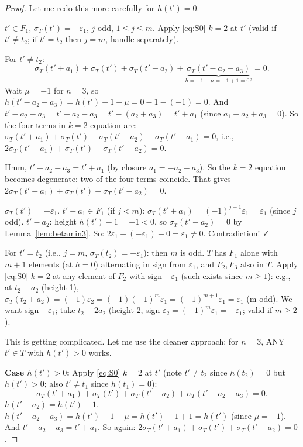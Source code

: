 \begin{proof}
Let me redo this more carefully for $h(t')=0$.

$t' \in F_1$, $\sigma_T(t') = -\varepsilon_1$, $j$ odd, $1 \leq j \leq m$. Apply \eqref{eq:S0} $k=2$ at $t'$ (valid if $t' \neq t_2$; if $t'=t_2$ then $j=m$, handle separately).

For $t' \neq t_2$:
\[
  \sigma_T(t'+a_1) + \sigma_T(t') + \sigma_T(t'-a_2) + \underbrace{\sigma_T(t'-a_2-a_3)}_{h = -1-\mu = -1+1=0?} = 0.
\]
Wait $\mu = -1$ for $n=3$, so $h(t'-a_2-a_3) = h(t') - 1 - \mu = 0 - 1 - (-1) = 0$. And $t'-a_2-a_3 = t' - a_2 - a_3 = t' - (a_2+a_3) = t'+a_1$ (since $a_1+a_2+a_3=0$). So the four terms in $k=2$ equation are: $\sigma_T(t'+a_1) + \sigma_T(t') + \sigma_T(t'-a_2) + \sigma_T(t'+a_1) = 0$, i.e., $2\sigma_T(t'+a_1) + \sigma_T(t') + \sigma_T(t'-a_2) = 0$.

Hmm, $t'-a_2-a_3 = t'+a_1$ (by closure $a_1=-a_2-a_3$). So the $k=2$ equation becomes degenerate: two of the four terms coincide. That gives $2\sigma_T(t'+a_1)+\sigma_T(t')+\sigma_T(t'-a_2)=0$.

$\sigma_T(t') = -\varepsilon_1$. $t'+a_1 \in F_1$ (if $j < m$): $\sigma_T(t'+a_1)=(-1)^{j+1}\varepsilon_1 = \varepsilon_1$ (since $j$ odd). $t'-a_2$: height $h(t')-1 = -1 < 0$, so $\sigma_T(t'-a_2)=0$ by Lemma~\ref{lem:betamin3}. So: $2\varepsilon_1 + (-\varepsilon_1) + 0 = \varepsilon_1 \neq 0$. Contradiction! ✓

For $t' = t_2$ (i.e., $j = m$, $\sigma_T(t_2)=-\varepsilon_1$): then $m$ is odd. $T$ has $F_1$ alone with $m+1$ elements (at $h=0$) alternating in sign from $\varepsilon_1$, and $F_2,F_3$ also in $T$. Apply \eqref{eq:S0} $k=2$ at any element of $F_2$ with sign $-\varepsilon_1$ (such exists since $m \geq 1$): e.g., at $t_2 + a_2$ (height 1), $\sigma_T(t_2+a_2)=(-1)\varepsilon_2 = (-1)(-1)^m\varepsilon_1 = (-1)^{m+1}\varepsilon_1 = \varepsilon_1$ (m odd). We want sign $-\varepsilon_1$; take $t_2+2a_2$ (height 2, sign $\varepsilon_2 = (-1)^m\varepsilon_1 = -\varepsilon_1$; valid if $m \geq 2$).

This is getting complicated. Let me use the cleaner approach: for $n=3$, ANY $t' \in T$ with $h(t')>0$ works.

\textbf{Case $h(t') > 0$:} Apply \eqref{eq:S0} $k=2$ at $t'$ (note $t' \neq t_2$ since $h(t_2)=0$ but $h(t')>0$; also $t' \neq t_1$ since $h(t_1)=0$):
\[
  \sigma_T(t'+a_1)+\sigma_T(t')+\sigma_T(t'-a_2)+\sigma_T(t'-a_2-a_3)=0.
\]
$h(t'-a_2) = h(t')-1$. $h(t'-a_2-a_3) = h(t')-1-\mu = h(t')-1+1 = h(t')$ (since $\mu=-1$). And $t'-a_2-a_3 = t'+a_1$. So again: $2\sigma_T(t'+a_1)+\sigma_T(t')+\sigma_T(t'-a_2)=0$.


\end{proof}
